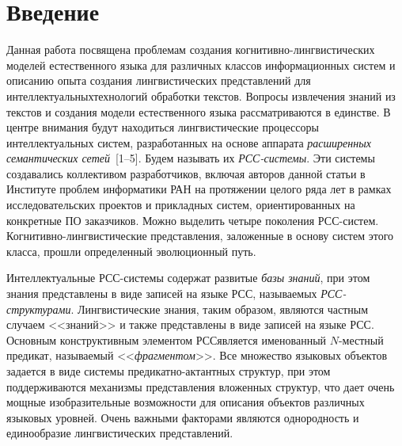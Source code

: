       \begin{multicols}{2}

      \label{st\stat}

\section{Введение}

     Данная работа посвящена проблемам создания\linebreak 
     когни\-тив\-но-линг\-ви\-сти\-че\-ских моделей естественного языка для 
различных классов информационных систем и описанию опыта создания 
линг\-ви\-сти\-че\-ских представлений для интеллектуальных\linebreak технологий 
обработки текстов. Вопросы извлечения знаний из текстов и создания модели 
естественного языка рассматриваются в единстве. В центре внимания будут 
находиться лингвистические процессоры интеллектуальных систем, 
разработанных на основе аппарата \textit{расширенных семантических 
сетей}~[1--5]. %
Будем 
называть их \textit{РСС-сис\-те\-мы}. Эти системы создавались коллективом 
разработчиков, включая авторов данной статьи в Институте проб\-лем 
информатики РАН на протяжении целого ряда лет в рамках 
исследовательских проектов и прикладных систем, ориентированных на 
конкретные ПО заказчиков. Можно выделить четыре 
поколения РСС-систем. Ко\-гни\-тив\-но-линг\-ви\-сти\-че\-ские 
представления, заложенные в основу систем этого класса, прошли 
определенный эволюционный путь. 
     
     Интеллектуальные РСС-сис\-те\-мы содержат развитые \textit{базы 
знаний}, при этом знания представлены в виде записей на языке 
РСС, называемых 
     \textit{РСС-струк\-ту\-ра\-ми}. Лингвистические знания, таким 
образом, являются частным случаем <<знаний>> и также представлены в 
виде записей на языке РСС. Основным 
конструктивным элементом РСС\linebreak является именованный $N$-мест\-ный 
предикат, на\-зы\-ва\-емый <<\textit{фрагментом}>>. Все множество языковых 
объектов задается в виде системы пре\-ди\-кат\-но-ак\-тант\-ных структур, при этом 
поддерживаются механизмы представления вложенных структур, что дает 
очень мощные изобразительные возможности для описания объектов 
различных языковых уровней. Очень важными факторами являются 
однородность и единообразие лингвистических представлений. 
     

\end{multicols}
